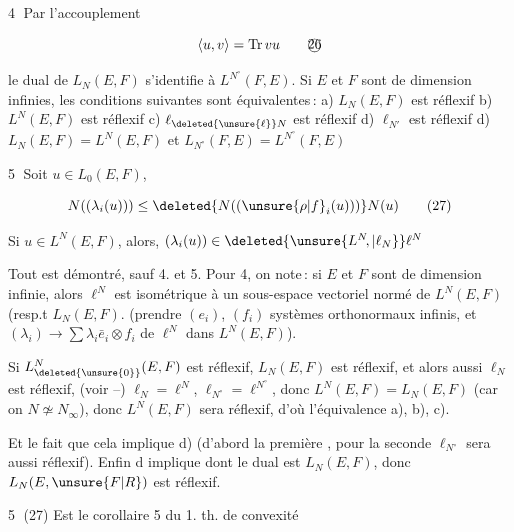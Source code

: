 
\textcircled{4} Par l'accouplement 

\[
\langle u,v\rangle=\operatorname{Tr}vu\tag*{\textcircled{26}}
\]

le dual de $L_N(E,F)$ s'identifie à $L^{N^\circ}(F,E)$. Si $E$ et $F$ sont de dimension infinies,   les conditions suivantes sont équivalentes\,: a) $L_N(E,F)$ est réflexif b) $L^N(E,F)$ est réflexif  c) $\ell_{\deleted{\unsure{\ell}}N}$ est réflexif  d) $\ell_{N'}$ est réflexif   d) $L_N(E,F)=L^N(E,F)$ et $L_{N^\circ}(F,E)=L^{N^\circ}(F,E)$

\textcircled{5}  Soit $u\in L_0(E,F)$,  

\[
N((\lambda_i(u)))\leq\deleted{N((\unsure{\rho|f}_i(u)))}N(u)\tag*{(27)}
\]

Si $u\in L^N(E,F)$,  alors, $(\lambda_i(u))\in\deleted{\unsure{L^N\!,|\ell_N}}\ell^N$ 

Tout est démontré, sauf 4.  et 5. Pour 4, on note\,: si $E$ et $F$ sont de dimension infinie, alors $\ell^N$  est isométrique à un sous-espace vectoriel normé de $L^N(E,F)$ (resp.t $L_N(E,F)$. (prendre $(e_i)$, $(f_i)$ systèmes orthonormaux infinis, et $(\lambda_i)\to\sum\lambda_i\bar e_i\otimes f_i$ de $\ell^N$ dans $L^N(E,F)$). 

Si $L^N_{\deleted{\unsure{0}}}(E,F)$ est réflexif, $L_N(E,F)$ est réflexif, et alors aussi $\ell_N$ est réflexif,  (voir --) $\ell_N=\ell^N$, $\ell_{N^\circ}=\ell^{N^\circ}$, donc $L^N(E,F)=L_N(E,F)$ (car on   $N\not\simeq N_\infty$), donc $L^N(E,F)$ sera réflexif, d'où l'équivalence a), b), c).

Et le fait que cela implique d) (d'abord la première , pour la seconde  $\ell_{N^\circ}$ sera aussi réflexif). Enfin d implique   dont le dual est $L_N(E,F)$, donc $L_N(E,\unsure{F|R})$ est réflexif.

\textcircled{5} (27) Est le corollaire 5 du 1. th. de convexité 
